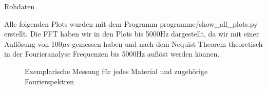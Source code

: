 \documentclass[twoside]{protokoll}
\begin{document}
\begin{aufgabe}{Rohdaten}
     
    Alle folgenden Plots wurden mit dem Programm programme/show\_all\_plots.py erstellt.
    Die FFT haben wir in den Plots bis 5000Hz dargestellt, da wir mit einer Auflösung von 100$\mu s$ gemessen haben und nach dem Nequist Theorem theoretisch in der Fourieranalyse Frequenzen bis 5000Hz auflöst werden können.
\begin{figure}[H]
    \caption{Exemplarische Messung für jedes Material und zugehörige Fourierspektren}
  \centering
\end{figure}
\begin{figure}[H]
  \centering

\end{figure}
\end{aufgabe}
\end{document}
